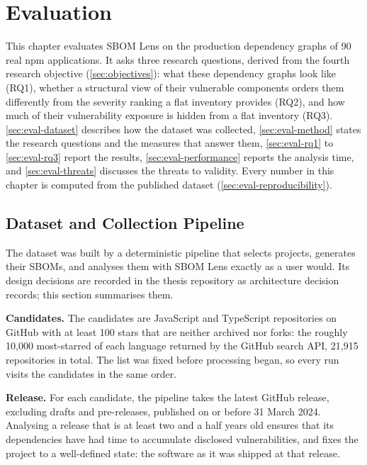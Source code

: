 \chapter[Evaluation]{Evaluation}
\label{cp:evaluation}

This chapter evaluates SBOM Lens on the production dependency graphs of 90 real npm applications. It asks three research questions, derived from the fourth research objective (\autoref{sec:objectives}): what these dependency graphs look like (RQ1), whether a structural view of their vulnerable components orders them differently from the severity ranking a flat inventory provides (RQ2), and how much of their vulnerability exposure is hidden from a flat inventory (RQ3). \autoref{sec:eval-dataset} describes how the dataset was collected, \autoref{sec:eval-method} states the research questions and the measures that answer them, \autoref{sec:eval-rq1} to \autoref{sec:eval-rq3} report the results, \autoref{sec:eval-performance} reports the analysis time, and \autoref{sec:eval-threats} discusses the threats to validity. Every number in this chapter is computed from the published dataset (\autoref{sec:eval-reproducibility}).


\section{Dataset and Collection Pipeline}
\label{sec:eval-dataset}

The dataset was built by a deterministic pipeline that selects projects, generates their SBOMs, and analyses them with SBOM Lens exactly as a user would. Its design decisions are recorded in the thesis repository as architecture decision records; this section summarises them.

\textbf{Candidates.} The candidates are JavaScript and TypeScript repositories on GitHub with at least 100 stars that are neither archived nor forks: the roughly 10{,}000 most-starred of each language returned by the GitHub search API, 21{,}915 repositories in total. The list was fixed before processing began, so every run visits the candidates in the same order.

\textbf{Release.} For each candidate, the pipeline takes the latest GitHub release, excluding drafts and pre-releases, published on or before 31 March 2024. Analysing a release that is at least two and a half years old ensures that its dependencies have had time to accumulate disclosed vulnerabilities, and fixes the project to a well-defined state: the software as it was shipped at that release.

